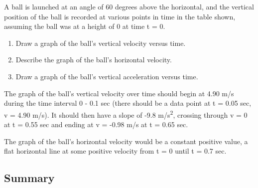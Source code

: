 \documentclass[
]{book}
\providecommand{\tightlist}{%
  \setlength{\itemsep}{0pt}\setlength{\parskip}{0pt}}
\begin{document}
A ball is launched at an angle of 60 degrees above the horizontal, and
the vertical position of the ball is recorded at various points in time
in the table shown, assuming the ball was at a height of 0 at time t =
0.

\begin{enumerate}
\def\labelenumi{\alph{enumi}.}
\tightlist
\item
  Draw a graph of the ball's vertical velocity versus time.
\item
  Describe the graph of the ball's horizontal velocity.
\item
  Draw a graph of the ball's vertical acceleration versus time.
\end{enumerate}

\leavevmode{}%
The graph of the ball's vertical velocity over time should begin at
4.90 m/s during the time interval 0 - 0.1 sec (there should be a data
point at t = 0.05 sec, v = 4.90 m/s). It should then have a slope of
-9.8 m/s\textsuperscript{2}, crossing through v = 0 at t = 0.55 sec and ending at v =
-0.98 m/s at t = 0.65 sec.

The graph of the ball's horizontal velocity would be a constant
positive value, a flat horizontal line at some positive velocity from t
= 0 until t = 0.7 sec.

\hypertarget{fs-id1165298622440-summary}{}
\hypertarget{summary-1}{%
\subsection{Summary}\label{summary-1}}
\end{document}
